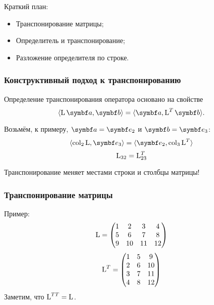 
\begin{frame} %


\end{frame}



\begin{frame}{Краткий план:}
  \begin{itemize}[<+->]
    \item Транспонирование матрицы;
    \item Определитель и транспонирование;
    \item Разложение определителя по строке.
  \end{itemize}

\end{frame}




\begin{frame}
    \frametitle{Конструктивный подход к транспонированию}

    Определение транспонирования оператора основано на свойстве 
    \[
        \langle \LL \ba, \bb \rangle = \langle \ba, \LL^T\bb\rangle.
    \]

    \pause

    Возьмём, к примеру, $\ba = \be_2$ и $\bb = \be_3$:
    \[
        \langle \col_2 \LL, \be_3 \rangle = \langle \be_2, \col_3 \LL^T \rangle
    \]
    \pause 
    \[
        \operatorname{L}_{32} = \operatorname{L}^T_{23}        
    \]
    \pause

    Транспонирование меняет местами строки и столбцы матрицы!


\end{frame}


\begin{frame}
    \frametitle{Транспонирование матрицы}

    Пример:
    \[
    \operatorname{L} = \begin{pmatrix}
        1 & 2 & 3 & 4 \\
        5 & 6 & 7 & 8 \\
        9 & 10 & 11 & 12 \\
    \end{pmatrix}    
    \]
    \pause
    \[
    \operatorname{L}^T = \begin{pmatrix}
        1 & 5 & 9 \\
        2 & 6 & 10 \\
        3 & 7 & 11 \\
        4 & 8 & 12 \\
    \end{pmatrix}    
    \]
    \pause
    Заметим, что $\operatorname{L}^{TT}=\operatorname{L}$.
\end{frame}


